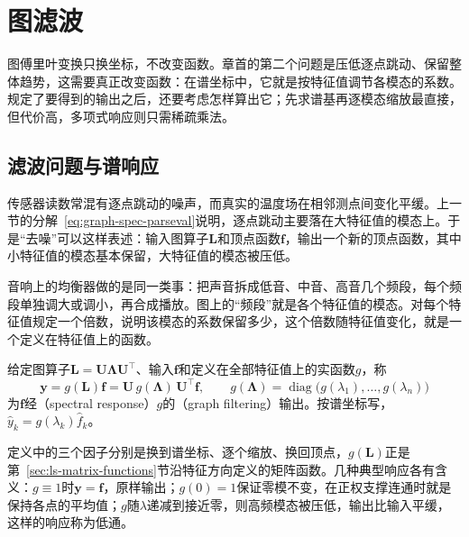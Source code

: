 
\section{图滤波}
\label{sec:graph-filtering}

图傅里叶变换只换坐标，不改变函数。章首的第二个问题是压低逐点跳动、保留整体趋势，这需要真正改变函数：在谱坐标中，它就是按特征值调节各模态的系数。规定了要得到的输出之后，还要考虑怎样算出它；先求谱基再逐模态缩放最直接，但代价高，多项式响应则只需稀疏乘法。

\subsection{滤波问题与谱响应}
\label{sec:graph-spec-filtering-problem}

传感器读数常混有逐点跳动的噪声，而真实的温度场在相邻测点间变化平缓。上一节的分解~\eqref{eq:graph-spec-parseval}说明，逐点跳动主要落在大特征值的模态上。于是“去噪”可以这样表述：输入图算子$\bm L$和顶点函数$\bm f$，输出一个新的顶点函数，其中小特征值的模态基本保留，大特征值的模态被压低。

音响上的均衡器做的是同一类事：把声音拆成低音、中音、高音几个频段，每个频段单独调大或调小，再合成播放。图上的“频段”就是各个特征值的模态。对每个特征值规定一个倍数，说明该模态的系数保留多少，这个倍数随特征值变化，就是一个定义在特征值上的函数。

\begin{definition}[谱滤波]
\label{def:graph-spec-spectral-filter}
给定图算子$\bm L=\bm U\bm\Lambda\bm U^{\top}$、输入$\bm f$和定义在全部特征值上的实函数$g$，称
\begin{equation}
 \bm y=g(\bm L)\bm f=\bm U\,g(\bm\Lambda)\,\bm U^{\top}\bm f,\qquad
 g(\bm\Lambda)=\operatorname{diag}\bigl(g(\lambda_1),\ldots,g(\lambda_n)\bigr)
 \label{eq:graph-spec-spectral-filter}
\end{equation}
为$\bm f$经（spectral response）$g$的（graph filtering）输出。按谱坐标写，$\widehat y_k=g(\lambda_k)\widehat f_k$。
\end{definition}

定义中的三个因子分别是换到谱坐标、逐个缩放、换回顶点，$g(\bm L)$正是第~\ref{sec:ls-matrix-functions}节沿特征方向定义的矩阵函数。几种典型响应各有含义：$g\equiv1$时$\bm y=\bm f$，原样输出；$g(0)=1$保证零模不变，在正权支撑连通时就是保持各点的平均值；$g$随$\lambda$递减到接近零，则高频模态被压低，输出比输入平缓，这样的响应称为低通。

